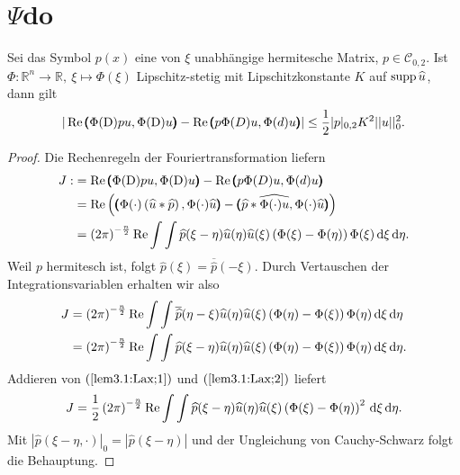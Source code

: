 \section{$\Psi$do}



\begin{lem}\label{lem3.1:Lax}
	Sei das Symbol $p(x)$ eine von $\xi$ unabhängige hermitesche Matrix, $p\in \mathcal{C}_{0,2}$. Ist $\Phi: \mathbb{R}^n\rightarrow\mathbb{R}, \ \xi \mapsto\Phi(\xi)$ Lipschitz-stetig mit Lipschitzkonstante $K$ auf $\operatorname{supp} \widehat{u}$, dann gilt
	\begin{align}
		| \operatorname{Re} \pmb(\Phi(\mathrm D)pu,\Phi(\mathrm D)u\pmb)-\operatorname{Re}\pmb(p\Phi(D)u,\Phi(d)u\pmb)| \le\frac{1}{2}| p|_{0,2}K^2|| u||_0^2.
\end{align}	 
\end{lem}
\begin{proof}
	Die Rechenregeln der Fouriertransformation liefern
	\begin{align}\label{lem3.1:Lax;1}
		\begin{split} J:&=  \operatorname{Re} \pmb(\Phi(\mathrm D)pu,\Phi(\mathrm D)u\pmb)-\operatorname{Re}\pmb(p\Phi(D)u,\Phi(d)u\pmb) \\
		&=\operatorname{Re} \left( \pmb(\Phi(\cdot)\left(\widehat{u}\ast \widehat{p}\right),\Phi(\cdot)\widehat{u}\pmb)-\pmb(\widehat{p}\ast\widehat{\Phi(\cdot)u},\Phi(\cdot)\widehat{u}\pmb)\right)\\
		&= \left(2\pi\right)^{-\frac{n}{2}}\operatorname{Re}\int\int\widehat{p}(\xi-\eta)\widehat{u}(\eta)\widehat{u}(\xi)\left(\Phi(\xi)-\Phi(\eta)\right)\Phi(\xi)\,\mathrm d \xi\,\mathrm d\eta.
		\end{split}
	\end{align}
	Weil $p$ hermitesch ist, folgt $\widehat{p}(\xi) = \overline{\widehat{p}}(-\xi)$. Durch Vertauschen der Integrationsvariablen erhalten wir also
	\begin{align}\label{lem3.1:Lax;2}
	\begin{split}	J&= \left(2\pi\right)^{-\frac{n}{2}}\operatorname{Re}\int\int\overline{\widehat{p}}(\eta-\xi)\widehat{u}(\eta)\widehat{u}(\xi)\left(\Phi(\eta)-\Phi(\xi)\right)\Phi(\eta)\,\mathrm d \xi\,\mathrm d\eta\\
		&= \left(2\pi\right)^{-\frac{n}{2}}\operatorname{Re}\int\int\widehat{p}(\xi-\eta)\widehat{u}(\eta)\widehat{u}(\xi)\left(\Phi(\eta)-\Phi(\xi)\right)\Phi(\eta)\,\mathrm d \xi\,\mathrm d\eta.
	\end{split}	
	\end{align}
	Addieren von $(\ref{lem3.1:Lax;1})$ und $(\ref{lem3.1:Lax;2})$ liefert
	\begin{align}
		J= \frac{1}{2}\left(2\pi\right)^{-\frac{n}{2}}\operatorname{Re}\int\int \widehat{p}(\xi-\eta)\widehat{u}(\eta)\widehat{u}(\xi)\left(\Phi(\xi)-\Phi(\eta)\right)^2\,\mathrm d\xi\,\mathrm d\eta.
	\end{align}
	Mit $| \widehat{p}(\xi-\eta,\cdot)|_0 = | \widehat{p}(\xi-\eta)|$ und der Ungleichung von Cauchy-Schwarz folgt die Behauptung. 
\end{proof}

